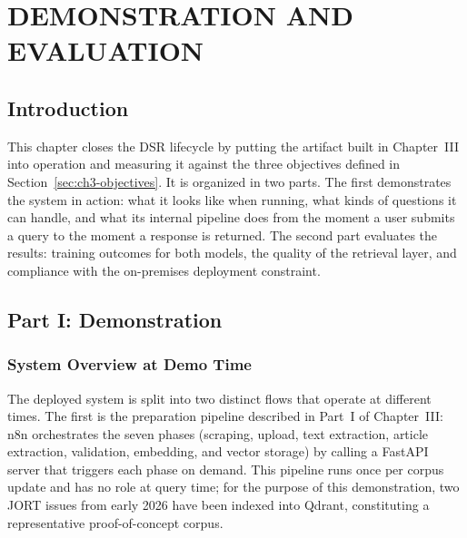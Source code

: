 \chapter{DEMONSTRATION AND EVALUATION}

\section{Introduction}
\label{sec:ch4-introduction}

This chapter closes the \ac{DSR} lifecycle by putting the artifact built in Chapter~III into operation and measuring it against the three objectives defined in Section~\ref{sec:ch3-objectives}. It is organized in two parts. The first demonstrates the system in action: what it looks like when running, what kinds of questions it can handle, and what its internal pipeline does from the moment a user submits a query to the moment a response is returned. The second part evaluates the results: training outcomes for both models, the quality of the retrieval layer, and compliance with the on-premises deployment constraint.

\section{Part I: Demonstration}
\label{sec:ch4-demonstration}

\subsection{System Overview at Demo Time}
\label{subsec:ch4-system-overview}

The deployed system is split into two distinct flows that operate at different times. The first is the preparation pipeline described in Part~I of Chapter~III: n8n orchestrates the seven phases (scraping, upload, text extraction, article extraction, validation, embedding, and vector storage) by calling a FastAPI server that triggers each phase on demand. This pipeline runs once per corpus update and has no role at query time; for the purpose of this demonstration, two \ac{JORT} issues from early 2026 have been indexed into Qdrant, constituting a representative proof-of-concept corpus.

\vspace{0.5em}

